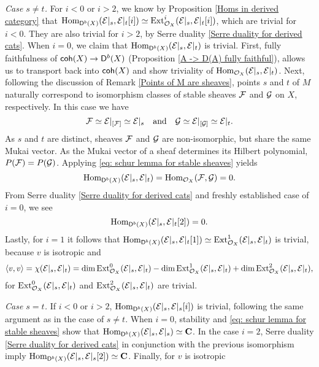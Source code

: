     \vspace{0.3cm}
    \noindent
    \textsl{Case $s \neq t$.}  
    For $i < 0$ or $i > 2$, we know by Proposition \ref{Homs in derived category} that $\operatorname{Hom}_{\mathsf{D}^b(X)}(\mathcal E|_s, \mathcal E|_t[i]) \simeq \operatorname{Ext}^i_{{\mathcal{O}_{X}}}(\mathcal E|_s, \mathcal E|_t[i])$, which are trivial for $i < 0$. They are also trivial for $i > 2$, by Serre duality \ref{Serre duality for derived cats}. When $i = 0$, we claim that $\operatorname{Hom}_{\mathsf{D}^b(X)}(\mathcal E|_s, \mathcal E|_t)$ is trivial. First, fully faithfulness of $\mathsf{coh}(X) \to \mathsf{D}^b(X)$ (\cf Proposition \ref{A -> D(A) fully faithful}), allows us to transport back into $\mathsf{coh}(X)$ and show triviality of $\operatorname{Hom}_{{\mathcal{O}_{X}}}(\mathcal E|_s, \mathcal E|_t)$. Next, following the discussion of Remark \ref{Points of M are sheaves}, points $s$ and $t$ of $M$ naturally correspond to isomorphism classes of stable sheaves $\mathcal F$ and $\mathcal G$ on $X$, respectively. In this case we have
    \[
        \mathcal F \simeq \mathcal E|_{[\mathcal F]} \simeq \mathcal E|_s \quad \text{and} \quad \mathcal G \simeq \mathcal E|_{[\mathcal G]} \simeq \mathcal E|_t.
    \]
    As $s$ and $t$ are distinct, sheaves $\mathcal F$ and $\mathcal G$ are non-isomorphic, but share the same Mukai vector. As the Mukai vector of a sheaf determines its Hilbert polynomial, $P(\mathcal F) = P(\mathcal G)$. Applying \eqref{eq: schur lemma for stable sheaves} yields 
    \[
        \operatorname{Hom}_{\mathsf{D}^b(X)}(\mathcal E|_s, \mathcal E|_t) = \operatorname{Hom}_{{\mathcal{O}_{X}}}(\mathcal F, \mathcal G)= 0. 
    \]
    From Serre duality \ref{Serre duality for derived cats} and freshly established case of $i = 0$, we see 
    \[
        \operatorname{Hom}_{\mathsf{D}^b(X)}(\mathcal E|_s, \mathcal E|_t[2]) = 0.
    \]
    Lastly, for $i = 1$ it follows that $\operatorname{Hom}_{\mathsf{D}^b(X)}(\mathcal E|_s, \mathcal E|_t[1]) \simeq \operatorname{Ext}^1_{\mathcal{O}_{X}}(\mathcal E|_s, \mathcal E|_t)$ is trivial, because $v$ is isotropic and 
    \[
        \langle v, v \rangle = \chi(\mathcal E|_s, \mathcal E|_t) = \dim\operatorname{Ext}^0_{\mathcal{O}_{X}}(\mathcal E|_s, \mathcal E|_t) - \dim\operatorname{Ext}^1_{\mathcal{O}_{X}}(\mathcal E|_s, \mathcal E|_t) + \dim\operatorname{Ext}^2_{\mathcal{O}_{X}}(\mathcal E|_s, \mathcal E|_t),
    \]
    for $\operatorname{Ext}^0_{\mathcal{O}_{X}}(\mathcal E|_s, \mathcal E|_t)$ and $\operatorname{Ext}^2_{\mathcal{O}_{X}}(\mathcal E|_s, \mathcal E|_t)$ are trivial.

    \vspace{0.3cm}
    \noindent
    \textsl{Case $s = t$.}
    If $i < 0$ or $i > 2$, $\operatorname{Hom}_{\mathsf{D}^b(X)}(\mathcal E|_s, \mathcal E|_s[i])$ is trivial, following the same argument as in the case of $s \neq t$. When $i = 0$, stability and \eqref{eq: schur lemma for stable sheaves} show that $\operatorname{Hom}_{\mathsf{D}^b(X)}(\mathcal E|_s, \mathcal E|_s) \simeq \mathbf C$. In the case $i = 2$, Serre duality \ref{Serre duality for derived cats} in conjunction with the previous isomorphism imply $\operatorname{Hom}_{\mathsf{D}^b(X)}(\mathcal E|_s, \mathcal E|_s[2]) \simeq \mathbf C$. Finally, for $v$ is isotropic 

